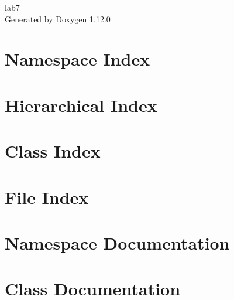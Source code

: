 \documentclass[twoside]{book}
\newcommand{\+}{\discretionary{\mbox{\scriptsize$\hookleftarrow$}}{}{}}
\newcommand{\clearemptydoublepage}{%
    \newpage{\pagestyle{empty}\cleardoublepage}%
  }
\begin{document}
  \raggedbottom
    \hypersetup{pageanchor=false,
                bookmarksnumbered=true,
                pdfencoding=unicode
               }
  \begin{titlepage}
  \vspace*{7cm}
  \begin{center}%
  {\Large lab7}\\
  \vspace*{1cm}
  {\large Generated by Doxygen 1.12.0}\\
  \end{center}
  \end{titlepage}
  \clearemptydoublepage
  \tableofcontents
  \clearemptydoublepage
  \hypersetup{pageanchor=true}
\chapter{Namespace Index}

\chapter{Hierarchical Index}

\chapter{Class Index}

\chapter{File Index}

\chapter{Namespace Documentation}

\chapter{Class Documentation}
























\end{document}
